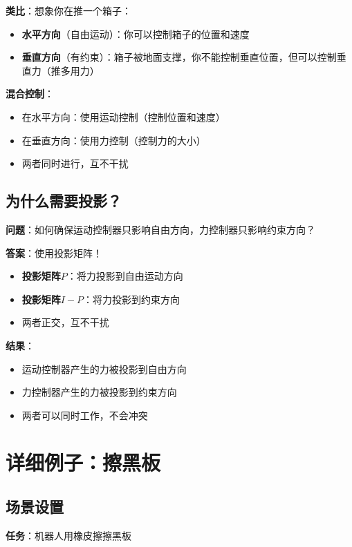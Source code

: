 \documentclass[12pt,a4paper]{article}
\begin{document}
\textbf{类比}：想象你在推一个箱子：

\begin{itemize}
\item \textbf{水平方向}（自由运动）：你可以控制箱子的位置和速度
\item \textbf{垂直方向}（有约束）：箱子被地面支撑，你不能控制垂直位置，但可以控制垂直力（推多用力）
\end{itemize}

\textbf{混合控制}：
\begin{itemize}
\item 在水平方向：使用运动控制（控制位置和速度）
\item 在垂直方向：使用力控制（控制力的大小）
\item 两者同时进行，互不干扰
\end{itemize}

\subsection{为什么需要投影？}

\textbf{问题}：如何确保运动控制器只影响自由方向，力控制器只影响约束方向？

\textbf{答案}：使用投影矩阵！

\begin{itemize}
\item \textbf{投影矩阵$P$}：将力投影到自由运动方向
\item \textbf{投影矩阵$I-P$}：将力投影到约束方向
\item 两者正交，互不干扰
\end{itemize}

\textbf{结果}：
\begin{itemize}
\item 运动控制器产生的力被投影到自由方向
\item 力控制器产生的力被投影到约束方向
\item 两者可以同时工作，不会冲突
\end{itemize}

\section{详细例子：擦黑板}

\subsection{场景设置}

\textbf{任务}：机器人用橡皮擦擦黑板
\end{document}
